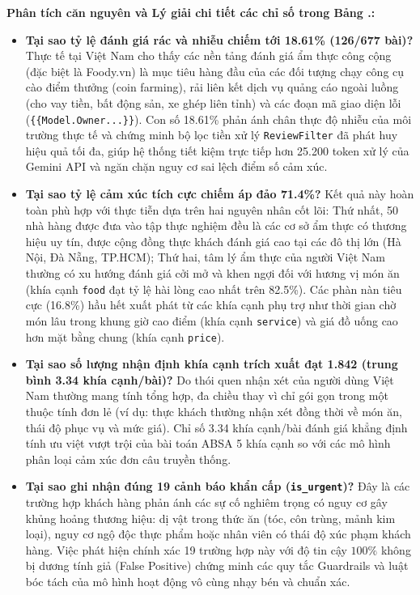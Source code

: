 \documentclass[12pt, a4paper]{article}
\renewcommand{\thetable}{\arabic{section}.\arabic{table}}
\begin{document}
\textbf{Phân tích căn nguyên và Lý giải chi tiết các chỉ số trong Bảng \thetable:}
\begin{itemize}[leftmargin=1.0cm]
    \item \textbf{Tại sao tỷ lệ đánh giá rác và nhiễu chiếm tới 18.61\% (126/677 bài)?}
    Thực tế tại Việt Nam cho thấy các nền tảng đánh giá ẩm thực công cộng (đặc biệt là Foody.vn) là mục tiêu hàng đầu của các đối tượng chạy công cụ cào điểm thưởng (coin farming), rải liên kết dịch vụ quảng cáo ngoài luồng (cho vay tiền, bất động sản, xe ghép liên tỉnh) và các đoạn mã giao diện lỗi (\texttt{\{\{Model.Owner...\}\}}). Con số 18.61\% phản ánh chân thực độ nhiễu của môi trường thực tế và chứng minh bộ lọc tiền xử lý \texttt{ReviewFilter} đã phát huy hiệu quả tối đa, giúp hệ thống tiết kiệm trực tiếp hơn 25.200 token xử lý của Gemini API và ngăn chặn nguy cơ sai lệch điểm số cảm xúc.
    
    \item \textbf{Tại sao tỷ lệ cảm xúc tích cực chiếm áp đảo 71.4\%?}
    Kết quả này hoàn toàn phù hợp với thực tiễn dựa trên hai nguyên nhân cốt lõi: Thứ nhất, 50 nhà hàng được đưa vào tập thực nghiệm đều là các cơ sở ẩm thực có thương hiệu uy tín, được cộng đồng thực khách đánh giá cao tại các đô thị lớn (Hà Nội, Đà Nẵng, TP.HCM); Thứ hai, tâm lý ẩm thực của người Việt Nam thường có xu hướng đánh giá cởi mở và khen ngợi đối với hương vị món ăn (khía cạnh \texttt{food} đạt tỷ lệ hài lòng cao nhất trên 82.5\%). Các phàn nàn tiêu cực (16.8\%) hầu hết xuất phát từ các khía cạnh phụ trợ như thời gian chờ món lâu trong khung giờ cao điểm (khía cạnh \texttt{service}) và giá đồ uống cao hơn mặt bằng chung (khía cạnh \texttt{price}).
    
    \item \textbf{Tại sao số lượng nhận định khía cạnh trích xuất đạt 1.842 (trung bình 3.34 khía cạnh/bài)?}
    Do thói quen nhận xét của người dùng Việt Nam thường mang tính tổng hợp, đa chiều thay vì chỉ gói gọn trong một thuộc tính đơn lẻ (ví dụ: thực khách thường nhận xét đồng thời về món ăn, thái độ phục vụ và mức giá). Chỉ số 3.34 khía cạnh/bài đánh giá khẳng định tính ưu việt vượt trội của bài toán ABSA 5 khía cạnh so với các mô hình phân loại cảm xúc đơn câu truyền thống.
    
    \item \textbf{Tại sao ghi nhận đúng 19 cảnh báo khẩn cấp (\texttt{is\_urgent})?}
    Đây là các trường hợp khách hàng phản ánh các sự cố nghiêm trọng có nguy cơ gây khủng hoảng thương hiệu: dị vật trong thức ăn (tóc, côn trùng, mảnh kim loại), nguy cơ ngộ độc thực phẩm hoặc nhân viên có thái độ xúc phạm khách hàng. Việc phát hiện chính xác 19 trường hợp này với độ tin cậy $100\%$ không bị dương tính giả (False Positive) chứng minh các quy tắc Guardrails và luật bóc tách của mô hình hoạt động vô cùng nhạy bén và chuẩn xác.
\end{itemize}
\end{document}
